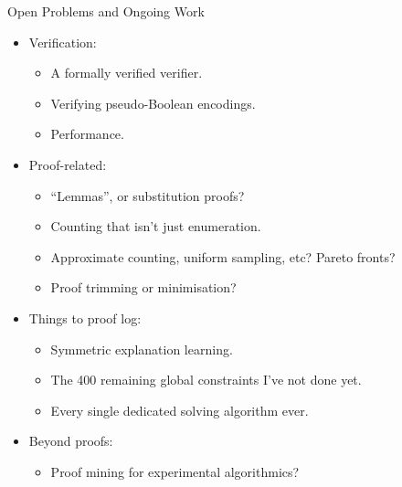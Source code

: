 \documentclass{beamer}
\begin{document}
\begin{frame}{Open Problems and Ongoing Work}
    \begin{itemize}
        \item Verification:
            \begin{itemize}
                \item A formally verified verifier.
                \item Verifying pseudo-Boolean encodings.
                \item Performance.
            \end{itemize}
        \item Proof-related:
            \begin{itemize}
                \item ``Lemmas'', or substitution proofs?
                \item Counting that isn't just enumeration.
                \item Approximate counting, uniform sampling, etc? Pareto fronts?
                \item Proof trimming or minimisation?
            \end{itemize}
        \item Things to proof log:
            \begin{itemize}
                \item Symmetric explanation learning.
                \item The 400 remaining global constraints I've not done yet.
                \item Every single dedicated solving algorithm ever.
            \end{itemize}
        \item Beyond proofs:
            \begin{itemize}
                \item Proof mining for experimental algorithmics?
            \end{itemize}
    \end{itemize}
\end{frame}
\end{document}
